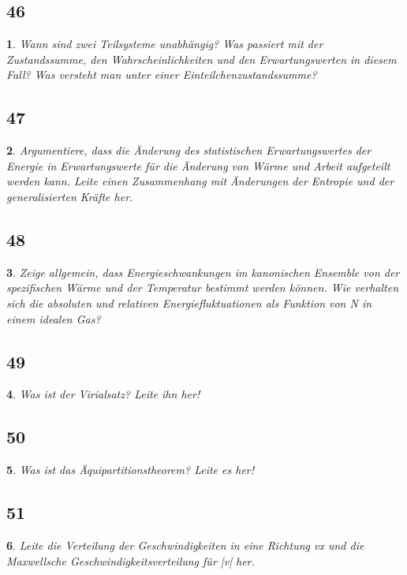 \documentclass[12pt,a4paper]{report}
\newtheorem{myfrag}{}%
\begin{document}
\subsection{46}
\begin{myfrag}
Wann sind zwei Teilsysteme unabhängig? Was passiert mit der Zustandssumme,
den Wahrscheinlichkeiten und den Erwartungswerten in diesem Fall? Was
versteht man unter einer Einteilchenzustandssumme?
\end{myfrag}
\subsection{47}
\begin{myfrag}
Argumentiere, dass die Änderung des statistischen Erwartungswertes der Energie
in Erwartungswerte für die Änderung von Wärme und Arbeit aufgeteilt werden
kann. Leite einen Zusammenhang mit Änderungen der Entropie und der
generalisierten Kräfte her.
\end{myfrag}
\subsection{48}
\begin{myfrag}
Zeige allgemein, dass Energieschwankungen im kanonischen Ensemble von der
spezifischen Wärme und der Temperatur bestimmt werden können. Wie verhalten
sich die absoluten und relativen Energiefluktuationen als Funktion von N in einem
idealen Gas?
\end{myfrag}
\subsection{49}
\begin{myfrag}
Was ist der Virialsatz? Leite ihn her!
\end{myfrag}
\subsection{50}
\begin{myfrag}
Was ist das Äquipartitionstheorem? Leite es her!
\end{myfrag}
\subsection{51}
\begin{myfrag}
Leite die Verteilung der Geschwindigkeiten in eine Richtung vx und die
Maxwellsche Geschwindigkeitsverteilung für |v| her.
\end{myfrag}
\end{document}
